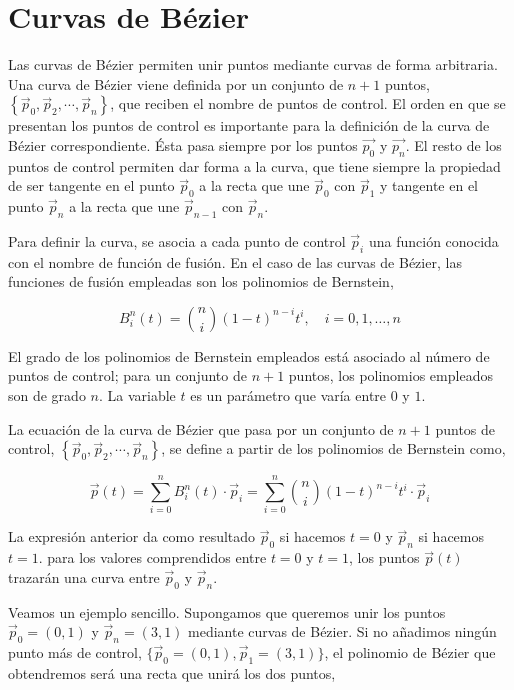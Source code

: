 \section{Curvas de Bézier}
Las curvas de Bézier permiten unir puntos mediante curvas de forma arbitraria.  Una curva de Bézier viene definida por un conjunto de $n+1$ puntos, $\left\lbrace\vec{p}_0, \vec{p}_2, \cdots, \vec{p}_n\right\rbrace$, que reciben el nombre de puntos de control. El orden en que se presentan los puntos de control es importante para la definición de la curva de Bézier correspondiente. Ésta pasa siempre por los puntos $\vec{p_0}$ y $\vec{p_n}$. El resto de los puntos de control permiten dar forma a la curva, que tiene siempre la propiedad de ser tangente en el punto $\vec{p}_0$ a la recta que une $\vec{p}_0$ con $\vec{p}_1$ y tangente en el punto $\vec{p}_n$ a la recta que une $\vec{p}_{n-1}$ con $\vec{p}_n$.

Para definir la curva, se asocia a cada punto de control $\vec{p}_i$ una función conocida con el nombre de función de fusión. En el caso de las curvas de Bézier, las funciones de fusión empleadas son los polinomios de Bernstein, 

\begin{equation*}
B_i^n (t)=\binom{n}{i}\left(1-t\right)^{n-i}t^i, \quad i = 0, 1, \dots, n
\end{equation*}

El grado de los polinomios de Bernstein empleados está asociado al número de puntos de control; para un conjunto de $n+1$ puntos, los polinomios empleados son de grado $n$. La variable $t$ es un parámetro que varía entre $0$ y $1$.

La ecuación de la curva de Bézier que pasa por un conjunto de $n+1$ puntos de control, $\left\lbrace\vec{p}_0, \vec{p}_2, \cdots, \vec{p}_n\right\rbrace$, se define a partir de los polinomios de Bernstein como,

\begin{equation*}
\vec{p}(t) = \sum_{i = 0}^n B_i^n(t) \cdot \vec{p}_i = \sum_{i = 0}^n \binom{n}{i}\left(1-t\right)^{n-i}t^i  \cdot \vec{p}_i
\end{equation*}

La expresión anterior da como resultado $\vec{p}_0$ si hacemos $t = 0$ y $\vec{p}_n$ si hacemos $t = 1$. para los valores comprendidos entre $t=0$ y $t=1$, los puntos $\vec{p}(t)$  trazarán una curva entre $\vec{p}_0$  y $\vec{p}_n$.

Veamos un ejemplo sencillo. Supongamos que queremos unir los puntos $\vec{p}_0 = (0,1)$ y $\vec{p}_n = (3,1)$ mediante curvas de Bézier. Si no añadimos ningún punto más de control, $\lbrace\vec{p}_0 = (0,1), \vec{p}_1 = (3,1)\rbrace$, el polinomio de Bézier que obtendremos será una recta que unirá los dos puntos,

